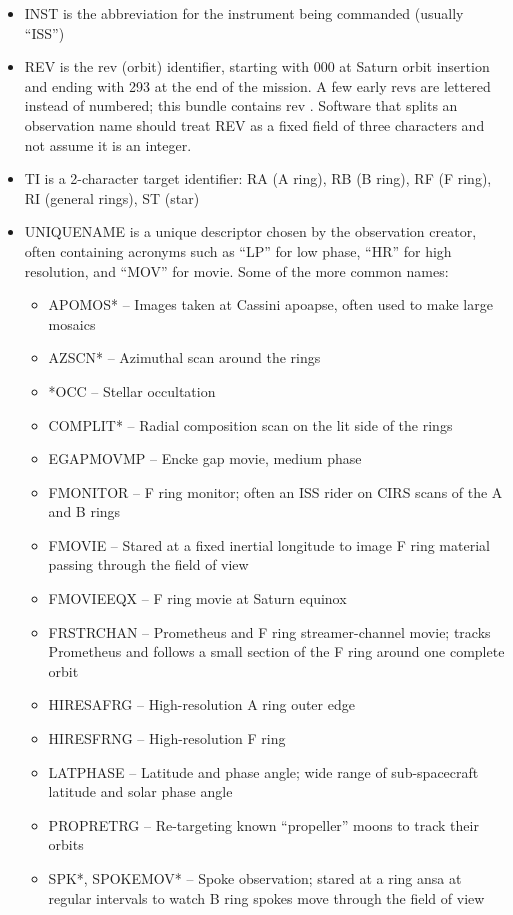 \begin{itemize}
\item INST is the abbreviation for the instrument being commanded (usually “ISS”)
\item REV is the rev (orbit) identifier, starting with 000 at Saturn orbit insertion and ending with 293 at the end of the mission. A few early revs are lettered instead of numbered; this bundle contains rev . Software that splits an observation name should treat REV as a fixed field of three characters and not assume it is an integer.
\item TI is a 2-character target identifier: RA (A ring), RB (B ring), RF (F ring), RI (general rings), ST (star)
\item UNIQUENAME is a unique descriptor chosen by the observation creator, often containing acronyms such as “LP” for low phase, “HR” for high resolution, and “MOV” for movie. Some of the more common names:
\begin{itemize}
\item APOMOS* – Images taken at Cassini apoapse, often used to make large mosaics
\item AZSCN* – Azimuthal scan around the rings
\item *OCC – Stellar occultation
\item COMPLIT* – Radial composition scan on the lit side of the rings
\item EGAPMOVMP – Encke gap movie, medium phase
\item FMONITOR – F ring monitor; often an ISS rider on CIRS scans of the A and B rings
\item FMOVIE – Stared at a fixed inertial longitude to image F ring material passing through the field of view
\item FMOVIEEQX – F ring movie at Saturn equinox
\item FRSTRCHAN – Prometheus and F ring streamer-channel movie; tracks Prometheus and follows a small section of the F ring around one complete orbit
\item HIRESAFRG – High-resolution A ring outer edge
\item HIRESFRNG – High-resolution F ring
\item LATPHASE – Latitude and phase angle; wide range of sub-spacecraft latitude and solar phase angle
\item PROPRETRG – Re-targeting known “propeller” moons to track their orbits
\item SPK*, SPOKEMOV* – Spoke observation; stared at a ring ansa at regular intervals to watch B ring spokes move through the field of view

\end{itemize}
\end{itemize}
